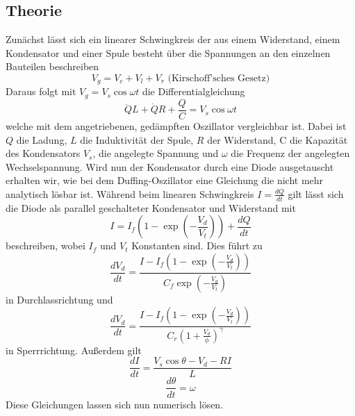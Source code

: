 \documentclass{scrartcl}
\begin{document}
\subsection { Theorie } \label{ssec:theo}
Zunächst lässt sich ein linearer Schwingkreis der aus einem Widerstand, einem Kondensator und einer Spule besteht über die Spannungen an den einzelnen Bauteilen beschreiben
$$V_g=V_c+V_l+V_r \text{ (Kirschoff'sches Gesetz)}$$
Daraus folgt mit $V_g=V_s\cos{\omega t}$ die Differentialgleichung
$$\ddot{Q}L + \dot{Q}R+ \frac{Q}{C} = V_s\cos{\omega t}$$
welche mit dem angetriebenen, gedämpften Oszillator vergleichbar ist. Dabei ist $Q$ die Ladung, $L$ die Induktivität der Spule, $R$ der Widerstand, C die Kapazität des Kondensators $V_s$, die angelegte Spannung und $\omega$ die Frequenz der angelegten Wechselspannung.
\newline
Wird nun der Kondensator durch eine Diode ausgetauscht erhalten wir, wie bei dem Duffing-Oszillator eine Gleichung die nicht mehr analytisch lösbar ist. Während beim linearen Schwingkreis $I=\frac{dQ}{dt}$ gilt lässt sich die Diode als parallel geschalteter Kondensator und Widerstand mit 
\begin{equation}I=I_f(1-\exp(-\frac{V_d}{V_t})) + \frac{dQ}{dt}\end{equation}
beschreiben, wobei $I_f$ und $V_t$ Konstanten sind.
Dies führt zu
\begin{equation}\frac{dV_d}{dt}= \frac{I-I_f(1-\exp(-\frac{V_d}{V_t}))}{C_f\exp(-\frac{V_d}{V_t})} \end{equation}
in Durchlassrichtung und 
\begin{equation}
\frac{dV_d}{dt}= \frac{I-I_f(1-\exp(-\frac{V_d}{V_t}))}{C_r(1+\frac{V_d}{\phi})^{\gamma}}
\end{equation}
in Sperrrichtung.
Außerdem gilt
\begin{equation}\frac{dI}{dt}=\frac{V_s \cos{\theta} - V_d - RI}{L}\end{equation}
\begin{equation}\frac{d\theta}{dt}=\omega\end{equation}
Diese Gleichungen lassen sich nun numerisch lösen.
\end{document}
